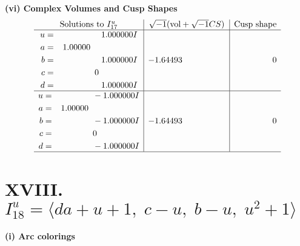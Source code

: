 \documentclass[1p]{elsarticle_modified}
\theoremstyle{definition}
\newcommand{\I}{\sqrt{-1}}
\begin{document}
\newpage\flushleft \textbf{(vi) Complex Volumes and Cusp Shapes}
$$\begin{array}{c|c|c}  
\text{Solutions to }I^u_{17}& \I (\text{vol} + \sqrt{-1}CS) & \text{Cusp shape}\\
 \hline 
\begin{aligned}
u &= \phantom{-0.000000 -}1.000000 I \\
a &= \phantom{-}1.00000\phantom{ +0.000000I} \\
b &= \phantom{-0.000000 -}1.000000 I \\
c &= \phantom{-0.000000 } 0 \\
d &= \phantom{-0.000000 -}1.000000 I\end{aligned}
 & -1.64493\phantom{ +0.000000I} & \phantom{-0.000000 } 0 \\ \hline\begin{aligned}
u &= \phantom{-0.000000 } -1.000000 I \\
a &= \phantom{-}1.00000\phantom{ +0.000000I} \\
b &= \phantom{-0.000000 } -1.000000 I \\
c &= \phantom{-0.000000 } 0 \\
d &= \phantom{-0.000000 } -1.000000 I\end{aligned}
 & -1.64493\phantom{ +0.000000I} & \phantom{-0.000000 } 0\\
 \hline 
 \end{array}$$\newpage\newpage\renewcommand{\arraystretch}{1}
\centering \section*{XVIII. $I^u_{18}= \langle d a+u+1,\;c- u,\;b- u,\;u^2+1 \rangle$}
\flushleft \textbf{(i) Arc colorings}\\
\end{document}

